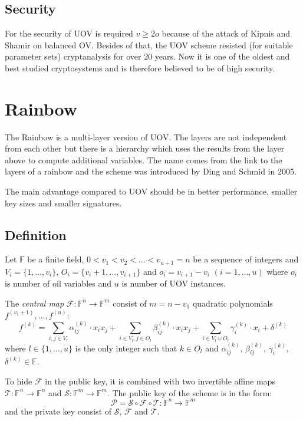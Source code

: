 \documentclass[thesis=M,english]{FITthesis}[2019/12/23]
\begin{document}
\subsection{Security}
For the security of UOV is required $v \geq 2o$ because of the attack of Kipnis and Shamir on balanced OV.\cite{L-KS98} Besides of that, the UOV scheme resisted (for suitable parameter sets) cryptanalysis for over 20 years. Now it is one of the oldest and best studied cryptosystems and is therefore believed to be of high security.

\newpage
\section{Rainbow}
The Rainbow is a multi-layer version of UOV. The layers are not independent from each other but there is a hierarchy which uses the results from the layer above to compute additional variables. The name comes from the link to the layers of a rainbow and the scheme was introduced by Ding and Schmid in 2005.

\bigskip
\noindent
The main advantage compared to UOV should be in better performance, smaller key sizes and smaller signatures.

\subsection{Definition}\label{rb-definition}
Let $\mathbb{F}$ be a finite field, $0<v_1<v_2<\ldots<v_{u+1} = n$ be a sequence of integers and $V_i=\{1, \ldots, v_i\}$, $O_i=\{v_i+1, \ldots, v_{i+1}\}$ and $o_i = v_{i+1} - v_i \,\, (i=1,\ldots,u)$ where $o_i$ is number of oil variables and $u$ is number of UOV instances.

\bigskip
\noindent
The \textit{central map} $\mathcal{F}:\mathbb{F}^n \rightarrow \mathbb{F}^m$ consist of $m = n - v_1$ quadratic polynomials $f^{(v_1+1)}, \ldots, f^{(n)}$:
\[
	f^{(k)} = \sum\limits_{i,j \in V_l}{\alpha_{ij}^{(k)} \cdot x_ix_j} +  \sum\limits_{i \in V_l,j \in O_l}{\beta_{ij}^{(k)} \cdot x_ix_j}+ \sum\limits_{i \in V_l \cup O_l}{\gamma_{i}^{(k)} \cdot x_i} + \delta^{(k)}
\]
where $l \in \{1, \ldots, u\}$ is the only integer such that $k \in O_l$ and $\alpha_{ij}^{(k)}$, $\beta_{ij}^{(k)}$, $\gamma_{i}^{(k)}$, $\delta^{(k)} \in \mathbb{F}$.

\bigskip
\noindent
To hide $\mathcal{F}$ in the public key, it is combined with two invertible affine maps $\mathcal{T}: \mathbb{F}^n \rightarrow \mathbb{F}^n$ and $\mathcal{S}: \mathbb{F}^m \rightarrow \mathbb{F}^m$. The public key of the scheme is in the form:
\[
	\mathcal{P} = \mathcal{S} \circ \mathcal{F} \circ \mathcal{T} : \mathbb{F}^n \rightarrow \mathbb{F}^m
\]
and the private key consist of $\mathcal{S}$, $\mathcal{F}$ and $\mathcal{T}$.
\end{document}
